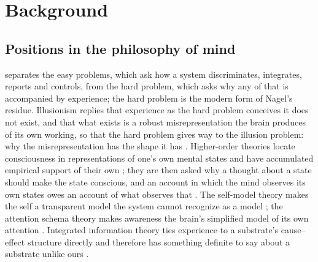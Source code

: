 \section{Background}
\label{sec:background}

\subsection{Positions in the philosophy of mind}
\label{sec:legacy}

\citet{chalmers1995} separates the easy problems, which ask how a system discriminates, integrates,
reports and controls, from the hard problem, which asks why any of that is accompanied by experience;
the hard problem is the modern form of Nagel's residue. Illusionism replies that experience as the hard
problem conceives it does not exist, and that what exists is a robust misrepresentation the brain
produces of its own working, so that the hard problem gives way to the illusion problem: why the
misrepresentation has the shape it has \citep{dennett1991,frankish2016}. Higher-order theories locate
consciousness in representations of one's own mental states and have accumulated empirical support of
their own \citep{rosenthal2005,lau2011}; they are then asked why a thought about a state should make
the state conscious, and an account in which the mind observes its own states owes an account of what
observes that \citep{ryle1949,dennett1991}. The self-model theory makes the self a transparent model
the system cannot recognize as a model \citep{metzinger2003}; the attention schema theory makes
awareness the brain's simplified model of its own attention \citep{graziano2011,graziano2013}.
Integrated information theory ties experience to a substrate's cause--effect structure directly and
therefore has something definite to say about a substrate unlike ours \citep{tononi2015}.


